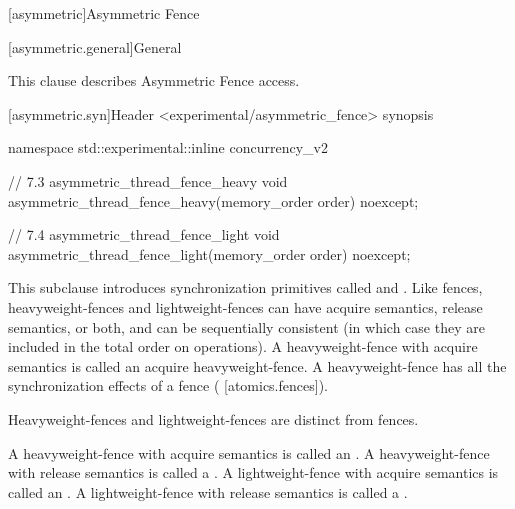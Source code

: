 
[asymmetric]{Asymmetric Fence}

[asymmetric.general]{General}

This clause describes Asymmetric Fence access. 


[asymmetric.syn]{Header <experimental/asymmetric_fence> synopsis}


\begin{codeblock}
namespace std::experimental::inline concurrency_v2 {

// 7.3 asymmetric_thread_fence_heavy
void asymmetric_thread_fence_heavy(memory_order order) noexcept;

// 7.4 asymmetric_thread_fence_light
void asymmetric_thread_fence_light(memory_order order) noexcept;
}
\end{codeblock}

\pnum

This subclause introduces synchronization primitives called  and
. Like fences, heavyweight-fences and lightweight-fences can have acquire
semantics, release semantics, or both, and can be sequentially consistent (in which case they
are included in the total order  on  operations). A heavyweight-fence
with acquire semantics is called an acquire heavyweight-fence. A heavyweight-fence has all the
synchronization effects of a fence ( [atomics.fences]). \begin{note}  Heavyweight-fences and
lightweight-fences are distinct from fences. \end{note}

\pnum
A heavyweight-fence with acquire semantics is called an . A
heavyweight-fence with release semantics is called a . A
lightweight-fence with acquire semantics is called an . A
lightweight-fence with release semantics is called a .

